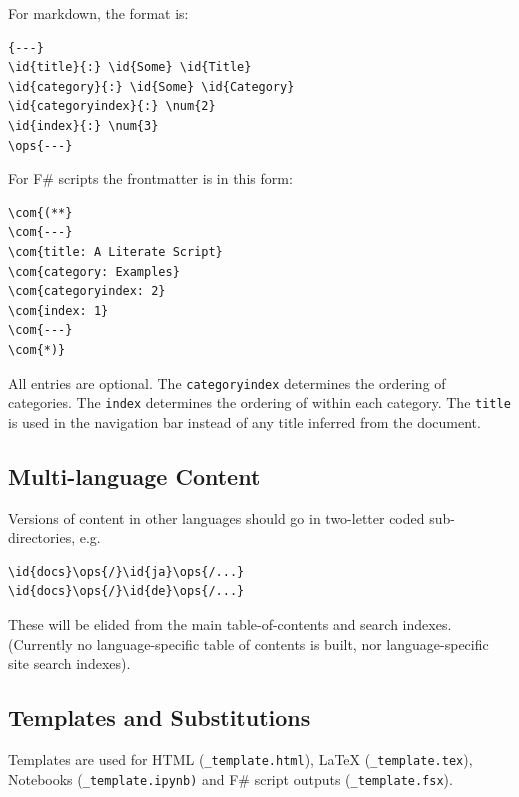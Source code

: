 \documentclass{article}
\newcommand{\id}[1]{\textcolor{black}{#1}}
\newcommand{\com}[1]{\textcolor{officegreen}{#1}}
\newcommand{\num}[1]{\textcolor{officegreen}{#1}}
\newcommand{\ops}[1]{\textcolor{purple}{#1}}
\begin{document}
For markdown, the format is:
\begin{Verbatim}[commandchars=\\\{\}]
{---}
\id{title}{:} \id{Some} \id{Title}
\id{category}{:} \id{Some} \id{Category}
\id{categoryindex}{:} \num{2}
\id{index}{:} \num{3}
\ops{---}

\end{Verbatim}



For F\# scripts the frontmatter is in this form:
\begin{Verbatim}[commandchars=\\\{\}]
\com{(**}
\com{---}
\com{title: A Literate Script}
\com{category: Examples}
\com{categoryindex: 2}
\com{index: 1}
\com{---}
\com{*)}

\end{Verbatim}



All entries are optional.
The \texttt{categoryindex} determines the ordering of categories.
The \texttt{index} determines the ordering of within each category.
The \texttt{title} is used in the navigation bar instead of any title inferred from the document.
\subsection*{Multi-language Content}



Versions of content in other languages should go in two-letter coded sub-directories, e.g.
\begin{Verbatim}[commandchars=\\\{\}]
\id{docs}\ops{/}\id{ja}\ops{/...}
\id{docs}\ops{/}\id{de}\ops{/...}

\end{Verbatim}



These will be elided from the main table-of-contents and search indexes.  (Currently no language-specific
table of contents is built, nor language-specific site search indexes).
\subsection*{Templates and Substitutions}



Templates are used for HTML (\texttt{\_template.html}), LaTeX (\texttt{\_template.tex}), Notebooks (\texttt{\_template.ipynb)}
and F\# script outputs (\texttt{\_template.fsx}).
\end{document}
